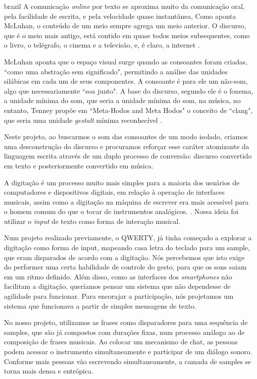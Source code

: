 \begin{otherlanguage*}{brazil}
A comunicação \emph{online} por texto se aproxima muito da comunicação oral, pela facilidade de escrita, e pela velocidade quase instantânea,\cite[33]{Levinson2001} Como aponta McLuhan, o conteúdo de um meio sempre agrega um meio anterior. O discurso, que é o meio mais antigo, está contido em quase todos meios subsequentes, como o livro, o telégrafo, o cinema e a televisão, e, é claro, a internet \cite[42]{Levinson2001}. 

McLuhan aponta que o espaço visual surge quando as consoantes foram criadas, ``como uma abstração sem significado", permitindo a análise das unidades silábicas em cada um de seus componentes. A consoante é para ele um não-som, algo que necessariamente ``soa junto". \cite[13-14]{mcluhan1968comunicaccoes} A base do discurso, segundo ele é o fonema, a unidade mínima do som, que seria a unidade mínima do som, na música, no entanto, Tenney  propõe em ``Meta-Hodos and Meta Hodos" o conceito de ``clang", que seria uma unidade \emph{gestalt} mínima reconhecível \cite[23]{Tenney1988}. 

Neste projeto, ao buscarmos o som das consoantes de um modo isolado, criamos uma desconstrução do discurso e procuramos reforçar esse caráter atomizante da linguagem escrita através de um duplo processo de conversão: discurso convertido em texto e posteriormente convertido em música.

A digitação é um processo muito mais simples para a maioria dos usuários de computadores e dispositivos digitais, em relação à operação de interfaces musicais, assim como a digitação na máquina de escrever era mais acessível para o homem comum do que o tocar de instrumentos analógicos. \cite[172]{Levinson2001}. Nossa ideia foi utilizar o \emph{input} de texto como forma de interação musical. 

Num projeto realizado previamente, o QWERTY, já tinha começado a explorar a digitação como forma de input, mapeando casa letra do teclado para um sample, que eram disparados de acordo com a digitação. Nós percebemos que isto exige do performer uma certa habilidade de controle do gesto, para que os sons saiam em um ritmo definido. Além disso, como as interfaces dos \emph{smartphones} não facilitam a digitação, queríamos pensar um sistema que não dependesse de agilidade para funcionar. Para encorajar a participação, nós projetamos um sistema que funcionava a partir de simples mensagens de texto.

No nosso projeto, utilizamos as frases como disparadores para uma sequência de samples, que são já compostos com durações fixas, num processo análogo ao de composição de frases musicais. Ao colocar um mecanismo de chat, as pessoas podem acessar o instrumento simultaneamente e participar de um diálogo sonoro. Conforme mais pessoas vão escrevendo simultaneamente, a camada de samples se torna mais densa e entrópica.


\end{otherlanguage*}
